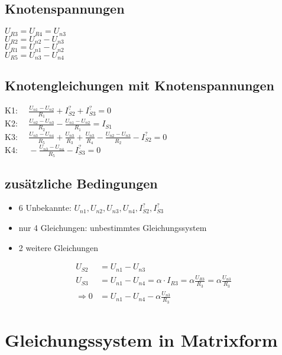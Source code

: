 \documentclass[11pt]{scrartcl}
\begin{document}
\subsection{Knotenspannungen}
\begin{doublespace}
\(\displaystyle U_{R3} = U_{R4} = U_{n3}\) \\
\(\displaystyle U_{R2} = U_{n2}- U_{n3}\) \\
\(\displaystyle U_{R1} = U_{n1}- U_{n2}\) \\
\(\displaystyle U_{R5} = U_{n3}- U_{n4}\)
\end{doublespace}

\subsection{Knotengleichungen mit Knotenspannungen}
\begin{spacing}{2.5}
  K1: \(\displaystyle \quad \frac{U_{n1} - U_{n2}}{R_1} + I_{S2}^? + I_{S3}^? = 0\) \\
  K2: \(\displaystyle \quad \frac{U_{n2} - U_{n3}}{R_2} - \frac{U_{n1} - U_{n2}}{R_1} = I_{S1}\) \\
  K3: \(\displaystyle \quad \frac{U_{n3} - U_{n4}}{R_5} + \frac{U_{n3}}{R_3} + \frac{U_{n3}}{R_4} - \frac{U_{n2} - U_{n3}}{R_2} - I_{S2}^?= 0\) \\
  K4: \(\displaystyle \quad - \frac{U_{n3} - U_{n4}}{R_5} - I_{S3}^? = 0\)
\end{spacing}

\subsection{zusätzliche Bedingungen}
\begin{itemize}
\item 6 Unbekannte: $U_{n1}, U_{n2}, U_{n3}, U_{n4}, I_{S2}^?, I_{S3}^?$
\item nur 4 Gleichungen: unbestimmtes Gleichungssystem
\item 2 weitere Gleichungen
\end{itemize}
\begin{align}
  U_{S2} &= U_{n1} - U_{n3} \\
  U_{S3} &= U_{n1} - U_{n4} = \alpha \cdot I_{R3} = \alpha \frac{U_{R3}}{R_3} = \alpha \frac{U_{n3}}{R_3} \nonumber \\
  \Longrightarrow 0 &= U_{n1} - U_{n4} - \alpha \frac{U_{n3}}{R_3}
\end{align}


\section{Gleichungssystem in Matrixform}
\end{document}
